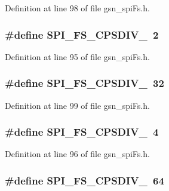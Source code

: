 Definition at line 98 of file gsn\_\-spiFs.h.

\hypertarget{a00589_ae4e038e7a7b87dff529ef6528cc2d311}{
\subsubsection[{SPI\_\-FS\_\-CPSDIV\_\-2}]{\setlength{\rightskip}{0pt plus 5cm}\#define SPI\_\-FS\_\-CPSDIV\_~2}}
\label{a00589_ae4e038e7a7b87dff529ef6528cc2d311}


Definition at line 95 of file gsn\_\-spiFs.h.

\hypertarget{a00589_ade855284438c3a7b00872b86afeb2a42}{
\subsubsection[{SPI\_\-FS\_\-CPSDIV\_\-32}]{\setlength{\rightskip}{0pt plus 5cm}\#define SPI\_\-FS\_\-CPSDIV\_~32}}
\label{a00589_ade855284438c3a7b00872b86afeb2a42}


Definition at line 99 of file gsn\_\-spiFs.h.

\hypertarget{a00589_ac646e8f734ae29267f935a5faab2cc88}{
\subsubsection[{SPI\_\-FS\_\-CPSDIV\_\-4}]{\setlength{\rightskip}{0pt plus 5cm}\#define SPI\_\-FS\_\-CPSDIV\_~4}}
\label{a00589_ac646e8f734ae29267f935a5faab2cc88}


Definition at line 96 of file gsn\_\-spiFs.h.

\hypertarget{a00589_a9c9080a0874c016fbec96a660044247f}{
\subsubsection[{SPI\_\-FS\_\-CPSDIV\_\-64}]{\setlength{\rightskip}{0pt plus 5cm}\#define SPI\_\-FS\_\-CPSDIV\_~64}}
\label{a00589_a9c9080a0874c016fbec96a660044247f}


